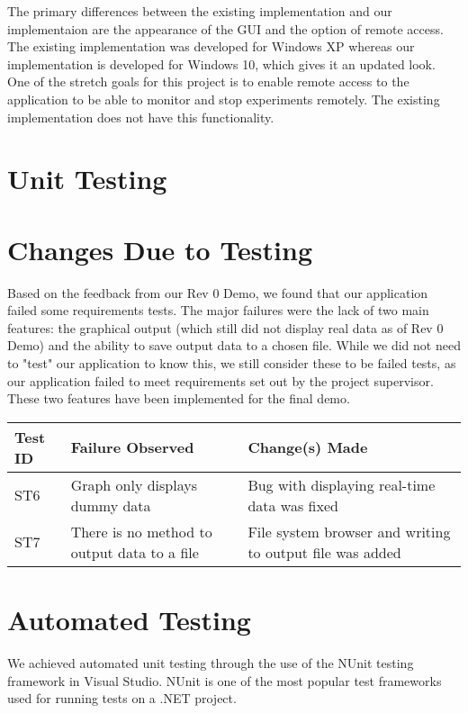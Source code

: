 \documentclass[12pt, titlepage]{article}
\begin{document}
\noindent The primary differences between the existing implementation and our implementaion are the appearance of the GUI and the option of remote access. The existing implementation was developed for Windows XP whereas our implementation is developed for Windows 10, which gives it an updated look. One of the stretch goals for this project is to enable remote access to the application to be able to monitor and stop experiments remotely. The existing implementation does not have this functionality.\\


\section{Unit Testing}


\section{Changes Due to Testing}

\noindent Based on the feedback from our Rev 0 Demo, we found that our application failed some requirements tests. The major failures were the lack of two main features: the graphical output (which still did not display real data as of Rev 0 Demo) and the ability to save output data to a chosen file. While we did not need to "test" our application to know this, we still consider these to be failed tests, as our application failed to meet requirements set out by the project supervisor. These two features have been implemented for the final demo. \\

\begin{tabular}{ |p{3cm}|p{5cm}|p{5cm}| }
  \hline
  \textbf{Test ID} & \textbf{Failure Observed} & \textbf{Change(s) Made} \\
  \hline 
  ST6 & Graph only displays dummy data & Bug with displaying real-time data was fixed \\ \hline
  ST7 & There is no method to output data to a file & File system browser and writing to output file was added \\
  \hline
 \end{tabular}


\section{Automated Testing}

\noindent We achieved automated unit testing through the use of the NUnit testing framework in Visual Studio. NUnit is one of the most popular test frameworks used for running tests on a .NET project.\\
\end{document}

